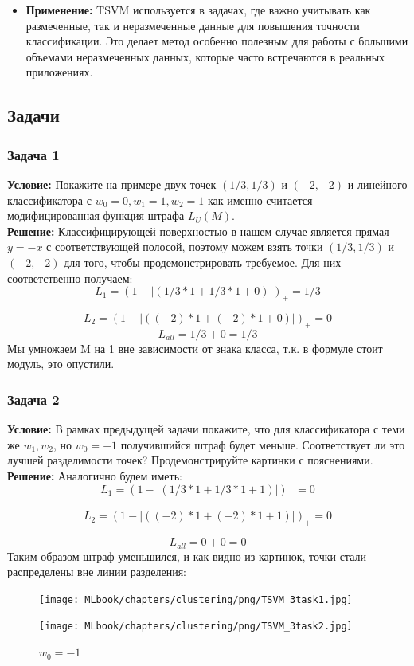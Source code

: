 \begin{itemize}
\begin{itemize}
    \item \textbf{Применение:} 
    TSVM используется в задачах, где важно учитывать как размеченные, так и неразмеченные данные для повышения точности классификации. Это делает метод особенно полезным для работы с большими объемами неразмеченных данных, которые часто встречаются в реальных приложениях.
\end{itemize}

\subsection{Задачи}
\subsubsection*{Задача 1}
\textbf{Условие:} Покажите на примере двух точек $(1/3, 1/3)$ и $(-2, -2)$ и линейного классификатора  с $w_0 = 0, w_1 = 1, w_2 = 1$ как именно считается модифицированная функция штрафа $L_U(M)$. \\
\textbf{Решение:}
Классифицирующей поверхностью в нашем случае является прямая $y = -x$ с соответствующей полосой, поэтому можем взять точки $(1/3, 1/3)$ и $(-2, -2)$ для того, чтобы продемонстрировать требуемое. Для них соответственно получаем:
\[
    L_1 = (1 - |(1/3*1 + 1/3*1 + 0)|)_+ = 1/3
\]

\[
    L_2 = (1 - |((-2)*1 + (-2)*1 + 0)|)_+ = 0
\]
\[
    L_{all} = 1/3 + 0 = 1/3
\]
Мы умножаем M на 1 вне зависимости от знака класса, т.к. в формуле стоит модуль, это опустили.
\subsubsection*{Задача 2}
\textbf{Условие:}
В рамках предыдущей задачи покажите, что для классификатора с теми же $w_1, w_2$, но $w_0 = -1$ получившийся штраф будет меньше. Соответствует ли это лучшей разделимости точек? Продемонстрируйте картинки с пояснениями.\\
\textbf{Решение:}
Аналогично будем иметь:
\[  
    L_1 = (1 - |(1/3*1 + 1/3*1 + 1)|)_+ = 0
\]

\[
    L_2 = (1 - |((-2)*1 + (-2)*1 + 1)|)_+ = 0
\]

\[
    L_{all} = 0 + 0 = 0
\]
Таким образом штраф уменьшился, и как видно из картинок, точки стали распределены вне линии разделения:
\begin{figure}[ht]
    \centering
    \begin{minipage}{0.45\textwidth}
        \centering
        \texttt{[image: MLbook/chapters/clustering/png/TSVM\_3task1.jpg]}
        \caption{$w_0 = 0$}
    \end{minipage}
    \hfill
    \begin{minipage}{0.45\textwidth}
        \centering
        \texttt{[image: MLbook/chapters/clustering/png/TSVM\_3task2.jpg]}
        \caption{$w_0 = -1$}
    \end{minipage}
\end{figure}


\end{itemize}
